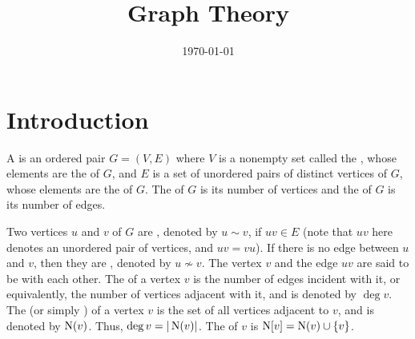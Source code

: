 
\title{\textbf{Graph Theory}}

\date{\today}
\maketitle

\begingroup
\let\clearpage\relax
\tableofcontents
\endgroup

\clearpage

\renewcommand{\nomname}{List of Symbols}



\printnomenclature[10em]

\clearpage

\section{Introduction}\label{sec:Intro}
A  is an ordered pair $G = (V, E)$ where $V$ is a nonempty set called the , whose elements are the  of $G$, and $E$ is a set of unordered pairs of distinct vertices of $G$, whose elements are the  of $G$. The  of $G$ is its number of vertices and the  of $G$ is its number of edges.

Two vertices $u$ and $v$ of $G$ are , denoted by $u \sim v$, if $uv \in E$ (note that $uv$ here denotes an unordered pair of vertices, and $uv = vu$). If there is no edge between $u$ and $v$, then they are , denoted by $u \nsim v$. The vertex $v$ and the edge $uv$ are said to be  with each other. The  of a vertex $v$ is the number of edges incident with it, or equivalently, the number of vertices adjacent with it, and is denoted by $\deg v$. The  (or simply ) of a vertex $v$ is the set of all vertices adjacent to $v$, and is denoted by $\operatorname{N}(v)$. Thus, $\deg v = |\operatorname{N}(v)|$. The  of $v$ is $\operatorname{N}[v] = \operatorname{N}(v) \cup \{v\}$.

